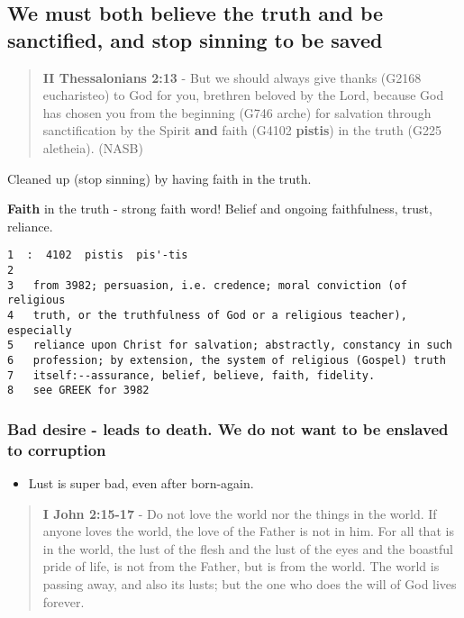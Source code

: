 \documentclass[11pt]{article}
\begin{document}
\subsection{We must \textbf{both} believe the truth and be sanctified, \textbf{and} stop sinning to be saved}
\label{sec:orgc46cdd5}
\begin{quote}
\textbf{II Thessalonians 2:13} - But we should always give thanks (G2168 eucharisteo) to God for you, brethren beloved by the Lord, because God has chosen you from the beginning (G746 arche) for salvation through sanctification by the Spirit \textbf{and} faith (G4102 \textbf{pistis}) in the truth (G225 aletheia). (NASB)
\end{quote}

Cleaned up (stop sinning) by having faith in the truth.

\textbf{Faith} in the truth - strong faith word! Belief and ongoing faithfulness, trust, reliance.

\begin{verbatim}
1  :  4102  pistis  pis'-tis
2  
3   from 3982; persuasion, i.e. credence; moral conviction (of religious
4   truth, or the truthfulness of God or a religious teacher), especially
5   reliance upon Christ for salvation; abstractly, constancy in such
6   profession; by extension, the system of religious (Gospel) truth
7   itself:--assurance, belief, believe, faith, fidelity.
8   see GREEK for 3982
\end{verbatim}

\subsubsection{Bad desire - leads to death. We do not want to be enslaved to corruption}
\label{sec:orgc744bf4}
\begin{itemize}
\item Lust is super bad, even after born-again.
\end{itemize}

\begin{quote}
\textbf{I John 2:15-17} - Do not love the world nor the things in the world. If anyone loves the world, the love of the Father is not in him. For all that is in the world, the lust of the flesh and the lust of the eyes and the boastful pride of life, is not from the Father, but is from the world. The world is passing away, and also its lusts; but the one who does the will of God lives forever.
\end{quote}
\end{document}
